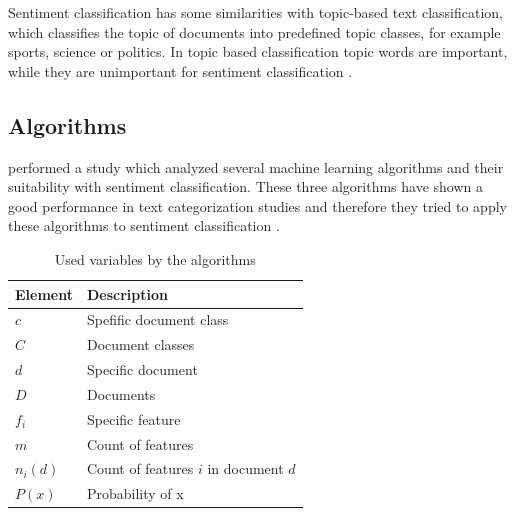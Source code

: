 Sentiment classification has some similarities with topic-based text classification, which classifies the topic of documents into predefined topic classes, for example sports, science or politics.
In topic based classification topic words are important, while they are unimportant for sentiment classification \cite[page 412f]{Liu2007}.

\subsection{Algorithms}
\label{ss:background-optionmining-alogrithms}

\citeauthor{Pang2002} performed a study which analyzed several machine learning algorithms and their suitability with sentiment classification.
These three algorithms have shown a good performance in text categorization studies and therefore they tried to apply these algorithms to sentiment classification \cite{Pang2002}.

\begin{table}
	\begin{center}
		\begin{tabular}{l l}
			\textbf{Element} & \textbf{Description} \\ \hline
			$c$ & Spefific document class \\
			$C$ & Document classes \\
			$d$ & Specific document \\
			$D$ & Documents \\
			$f_i$ & Specific feature \\
			$m$ & Count of features \\
			$n_i(d)$ & Count of features $i$ in document $d$ \\
			$P(x)$ & Probability of x \\
		\end{tabular}
	
		\label{tab:background-optionmining-algorithms-variables}
		\caption{Used variables by the algorithms}		
	\end{center}
\end{table}

